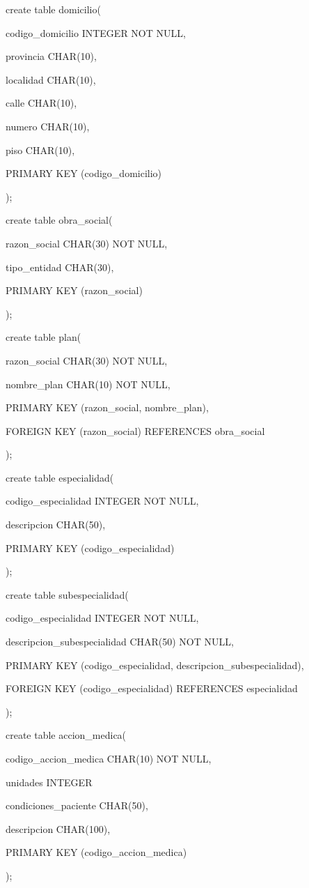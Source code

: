 \documentclass[a4paper,11pt]{article}
\begin{document}
create table domicilio(

codigo\_domicilio INTEGER NOT NULL, 

provincia  CHAR(10),

localidad  CHAR(10),

calle   CHAR(10),

numero  CHAR(10),

piso   CHAR(10),

PRIMARY KEY (codigo\_domicilio)

);

create table obra\_social(

razon\_social  CHAR(30) NOT NULL, 

tipo\_entidad  CHAR(30),

PRIMARY KEY (razon\_social)

); 

create table plan(

razon\_social  CHAR(30) NOT NULL,

nombre\_plan  CHAR(10) NOT NULL, 

PRIMARY KEY (razon\_social, nombre\_plan),

FOREIGN KEY (razon\_social) REFERENCES obra\_social

);  

create table especialidad(

codigo\_especialidad INTEGER NOT NULL, 

descripcion  CHAR(50),

PRIMARY KEY (codigo\_especialidad)

);  

create table subespecialidad(

codigo\_especialidad  INTEGER NOT NULL, 

descripcion\_subespecialidad CHAR(50) NOT NULL,

PRIMARY KEY (codigo\_especialidad, descripcion\_subespecialidad),

FOREIGN KEY (codigo\_especialidad) REFERENCES especialidad

);

create table accion\_medica(

codigo\_accion\_medica  CHAR(10) NOT NULL, 

unidades   INTEGER

condiciones\_paciente  CHAR(50),

descripcion   CHAR(100),

PRIMARY KEY (codigo\_accion\_medica)

); 
\end{document}
